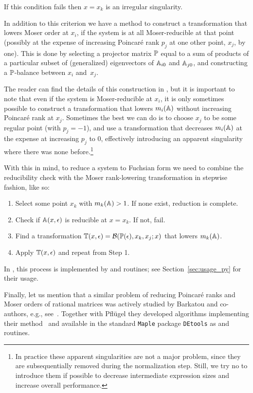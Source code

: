 \documentclass[12pt,a4paper]{article}
\begin{document}
If this condition fails then $x=x_k$ is an irregular singularity.

In addition to this criterion we have a method to construct a transformation that lowers Moser order at $x_i$, if the system is at all Moser-reducible at that point (possibly at the expense of increasing Poincar\'e rank $p_j$ at one other point, $x_j$, by one).
This is done by selecting a projector matrix $\mathbb{P}$ equal to a sum of products of a particular subset of (generalized) eigenvectors of $\mathbb{A}_{i0}$ and $\mathbb{A}_{j0}$, and constructing a $\mathbb{P}$-balance between $x_i$ and~$x_j$.

The reader can find the details of this construction in \cite{Lee15}, but it is important to note that even if the system is Moser-reducible at $x_i$, it is only sometimes possible to construct a transformation that lowers $m_i(\mathbb{A})$ without increasing Poincar\'e rank at $x_j$.
Sometimes the best we can do is to choose $x_j$ to be some regular point (with $p_j=-1$), and use a transformation that decreases $m_i(\mathbb{A})$ at the expense at increasing $p_j$ to $0$, effectively introducing an apparent singularity where there was none before.\footnote{
    In practice these apparent singularities are not a major problem, since they are subsequentially removed during the normalization step.
    Still, we try no to introduce them if possible to decrease intermediate expression sizes and increase overall performance.
}

With this in mind, to reduce a system to Fuchsian form we need to combine the reducibility check with the Moser rank-lowering transformation in stepwise fashion, like so:

\begin{enumerate}
    \item Select some point $x_k$ with $m_k(\mathbb{A}) > 1$. If none exist, reduction is complete.
    \item Check if $\mathbb{A}(x,\epsilon)$ is reducible at $x=x_k$. If not, fail.
    \item Find a transformation $\mathbb{T}(x,\epsilon) = \mathcal{B}(\mathbb{P}(\epsilon), x_k, x_j; x)$ that lowers $m_k(\mathbb{A})$.
    \item Apply $\mathbb{T}(x,\epsilon)$ and repeat from Step 1.
\end{enumerate}

In \fuchsia, this process is implemented by  and  routines; see Section~\ref{sec:usage_py} for their usage.

Finally, let us mention that a similar problem of reducing Poincar\'e ranks and Moser orders of rational matrices was actively studied by Barkatou and co-authors, e.g., see~\cite{BP99}.
Together with Pfl\"ugel they developed algorithms implementing their method~\cite{BP99} and available in the standard \texttt{Maple} package \texttt{DEtools} as  and  routines.
\end{document}
